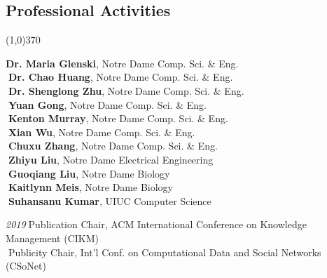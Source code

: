 \documentclass[10pt]{article}
\newenvironment{myindentpar}[1]%
{\begin{list}{}%
         {\setlength{\leftmargin}{#1}}%
         \item[]%
}
{\end{list}}
\newcounter{list}
\begin{document}
\subsection{\sc Professional Activities}
\vspace{-0.4cm} \line(1,0){370} \vspace{-0.1cm}

\begin{myindentpar}{0.75cm}

\hspace{-0.75cm}{\bf Ph.D. Thesis Committee}

{\small

\textcolor{white}{} {\bf Dr. Maria Glenski}, Notre Dame Comp. Sci. \& Eng. \\
\textcolor{white}{.}{\bf Dr. Chao Huang}, Notre Dame Comp. Sci. \& Eng. \\
\textcolor{white}{.}{\bf Dr. Shenglong Zhu}, Notre Dame Comp. Sci. \& Eng. \\
\textcolor{white}{.}{\bf Yuan Gong}, Notre Dame Comp. Sci. \& Eng. \\
\textcolor{white}{.}{\bf Kenton Murray}, Notre Dame Comp. Sci. \& Eng. \\
\textcolor{white}{.}{\bf Xian Wu}, Notre Dame Comp. Sci. \& Eng. \\
\textcolor{white}{.}{\bf Chuxu Zhang}, Notre Dame Comp. Sci. \& Eng. \\
\textcolor{white}{.}{\bf Zhiyu Liu}, Notre Dame Electrical Engineering \\
\textcolor{white}{.}{\bf Guoqiang Liu}, Notre Dame Biology \\
\textcolor{white}{.}{\bf Kaitlynn Meis}, Notre Dame Biology \\
\textcolor{white}{.}{\bf Suhansanu Kumar}, UIUC Computer Science

}


\hspace{-0.75cm}{\bf Organizing Committee}

{\small

\hspace{-0.75cm}\emph{2019}\textcolor{white}{.}Publication Chair, ACM International Conference on Knowledge Management (CIKM) \\
\textcolor{white}{.}Publicity Chair, Int'l Conf. on Computational Data and Social Networks (CSoNet)

}
\end{myindentpar}
\end{document}
